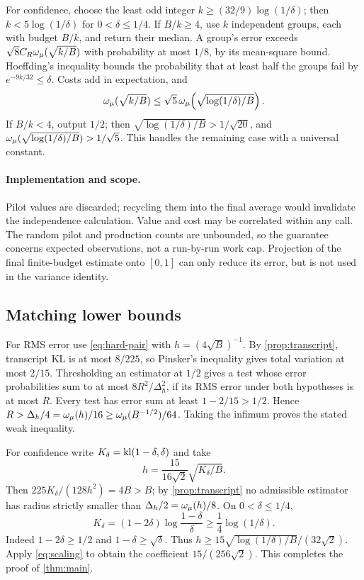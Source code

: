 For confidence, choose the least odd integer
$k\ge(32/9)\log(1/\delta)$; then $k<5\log(1/\delta)$ for
$0<\delta\le1/4$. If $B/k\ge4$, use $k$ independent groups, each with
budget $B/k$, and return their median. A group's error exceeds
$\sqrt8 C_R\omega_\mu(\sqrt{k/B})$ with probability at most $1/8$, by its
mean-square bound. Hoeffding's inequality bounds the probability that
at least half the groups fail by $e^{-9k/32}\le\delta$.
Costs add in expectation, and
\[
 \omega_\mu(\sqrt{k/B})\le\sqrt5\,
 \omega_\mu\!\left(\sqrt{\log(1/\delta)/B}\right).
\]
If $B/k<4$, output $1/2$; then
$\sqrt{\log(1/\delta)/B}>1/\sqrt{20}$, and
$\omega_\mu(\sqrt{\log(1/\delta)/B})>1/\sqrt5$.
This handles the remaining case with a universal constant.

\paragraph{Implementation and scope.}
Pilot values are discarded; recycling them into the final average would
invalidate the independence calculation. Value and cost may be correlated
within any call. The random pilot and production counts are unbounded, so
the guarantee concerns expected observations, not a run-by-run work cap.
Projection of the final finite-budget estimate onto $[0,1]$ can only reduce
its error, but is not used in the variance identity.

\subsection{Matching lower bounds}
For RMS error use \eqref{eq:hard-pair} with $h=(4\sqrt B)^{-1}$.
By \cref{prop:transcript}, transcript KL is at most $8/225$, so Pinsker's
inequality gives total variation at most $2/15$.
Thresholding an estimator at $1/2$ gives a test whose error probabilities
sum to at most $8R^2/\Delta_h^2$, if its RMS error under both hypotheses
is at most $R$. Every test has error sum at least $1-2/15>1/2$.
Hence $R>\Delta_h/4=\omega_\mu(h)/16\ge\omega_\mu(B^{-1/2})/64$.
Taking the infimum proves the stated weak inequality.

For confidence write $K_\delta=\operatorname{kl}(1-\delta,\delta)$ and take
\[
 h=\frac{15}{16\sqrt2}\sqrt{K_\delta/B}.
\]
Then $225K_\delta/(128h^2)=4B>B$; by \cref{prop:transcript} no admissible
estimator has radius strictly smaller than $\Delta_h/2=\omega_\mu(h)/8$.
On $0<\delta\le1/4$,
\begin{equation}\label{eq:confidence-kl}
 K_\delta=(1-2\delta)\log\frac{1-\delta}{\delta}
 \ge\frac14\log(1/\delta).
\end{equation}
Indeed $1-2\delta\ge1/2$ and $1-\delta\ge\sqrt\delta$.
Thus $h\ge15\sqrt{\log(1/\delta)/B}/(32\sqrt2)$.
Apply \eqref{eq:scaling} to obtain the coefficient $15/(256\sqrt2)$.
This completes the proof of \cref{thm:main}.

